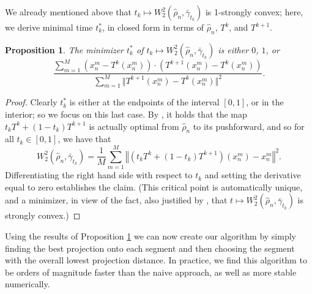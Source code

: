 \documentclass[aos, preprint]{imsart}
\theoremstyle{plain}
\newtheorem{prop}[theorem]{Proposition}
\theoremstyle{remark}
\begin{document}
\begin{appendix}
We already mentioned above that $t_{k}\mapsto W_{2}^{2}(\hat{\rho}_{n},\bar{\gamma}_{t_{k}})$
is 1-strongly convex; here, we derive minimal time $t_{k}^{*}$, in
closed form in terms of $\hat{\rho}_{n}$, $T^{k}$, and $T^{k+1}$.
\begin{prop}
\label{prop:approx_proj}
The minimizer $t_{k}^{*}$ of $t_{k}\mapsto W_{2}^{2}(\hat{\rho}_{n},\bar{\gamma}_{t_{k}})$
is either $0$, $1$, or
\[
\frac{\sum_{m=1}^{M}\left(x_{n}^{m}-T^{k}(x_{n}^{m})\right)\cdot\left(T^{k+1}(x_{n}^{m})-T^{k}(x_{n}^{m})\right)}{\sum_{m=1}^{M}\Vert T^{k+1}(x_{n}^{m})-T^{k}(x_{n}^{m})\Vert^{2}}.
\]
\end{prop}

\begin{proof}
Clearly $t_{k}^{*}$ is either at the endpoints of the interval $[0,1]$,
or in the interior; so we focus on this last case. By \cite[Lemma 9.2.1]{ambrosio2008gradient}, it holds that the map $t_{k}T^{k}+(1-t_{k})T^{k+1}$ is
actually optimal from $\hat{\rho}_{n}$ to its pushforward, and so
for all $t_{k}\in[0,1]$, we have that
\[
W_{2}^{2}(\hat{\rho}_{n},\bar{\gamma}_{t_{k}})=\frac{1}{M}\sum_{m=1}^{M}\left\Vert \left(t_{k}T^{k}+(1-t_{k})T^{k+1}\right)(x_{n}^{m})-x_{n}^{m}\right\Vert ^{2}.
\]
Differentiating the right hand side with respect to $t_{k}$ and setting
the derivative equal to zero establishes the claim. (This critical point is automatically unique, and a minimizer, in view of the fact, also justified by \cite[Lemma 9.2.1]{ambrosio2008gradient}, that $t\mapsto W_2^2(\hat{\rho}_n,\bar{\gamma}_{t_k})$ is strongly convex.)
\end{proof}


Using the results of Proposition \ref{prop:approx_proj} we can now create our algorithm by simply finding the best projection onto each segment and then choosing the segment with the overall lowest projection distance.
In practice, we find this algorithm to be orders of magnitude faster than the naive approach, as well as more stable numerically.

\begin{algorithm}[H]

    \caption{Efficient Projection of a Data Batch to the Curve}\label{alg:curve_projection}




\end{algorithm}
\end{appendix}
\end{document}
